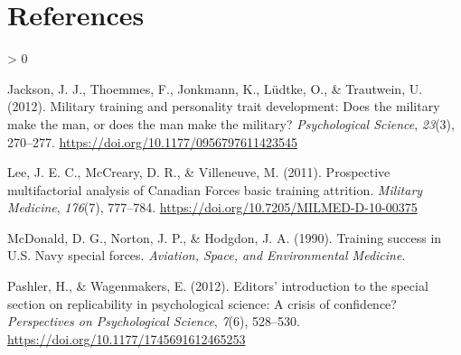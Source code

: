 \documentclass[
  notoc %
]{tufte-book}
\newlength{\cslhangindent}
\newenvironment{CSLReferences}[2] %
 {%
  \setlength{\parindent}{0pt}
  \ifodd #1 \everypar{\setlength{\hangindent}{\cslhangindent}}\ignorespaces\fi
  \ifnum #2 > 0
  \setlength{\parskip}{#2\baselineskip}
  \fi
 }%
 {}
\begin{document}
\hypertarget{references}{%
\chapter*{References}\label{references}}

\hypertarget{refs}{}
\begin{CSLReferences}{1}{0}
\leavevmode\hypertarget{ref-jackson2012military}{}%
Jackson, J. J., Thoemmes, F., Jonkmann, K., Lüdtke, O., \& Trautwein, U.
(2012). Military training and personality trait development: Does the
military make the man, or does the man make the military?
\emph{Psychological Science}, \emph{23}(3), 270--277.
\url{https://doi.org/10.1177/0956797611423545}

\leavevmode\hypertarget{ref-lee2011prospective}{}%
Lee, J. E. C., McCreary, D. R., \& Villeneuve, M. (2011). {Prospective
multifactorial analysis of Canadian Forces basic training attrition}.
\emph{Military Medicine}, \emph{176}(7), 777--784.
\url{https://doi.org/10.7205/MILMED-D-10-00375}

\leavevmode\hypertarget{ref-mcdonald1990training}{}%
McDonald, D. G., Norton, J. P., \& Hodgdon, J. A. (1990). {Training
success in U.S. Navy special forces.} \emph{Aviation, Space, and
Environmental Medicine}.

\leavevmode\hypertarget{ref-pashler2012editors}{}%
Pashler, H., \& Wagenmakers, E. (2012). Editors' introduction to the
special section on replicability in psychological science: A crisis of
confidence? \emph{Perspectives on Psychological Science}, \emph{7}(6),
528--530. \url{https://doi.org/10.1177/1745691612465253}

\end{CSLReferences}

\backmatter
\end{document}

